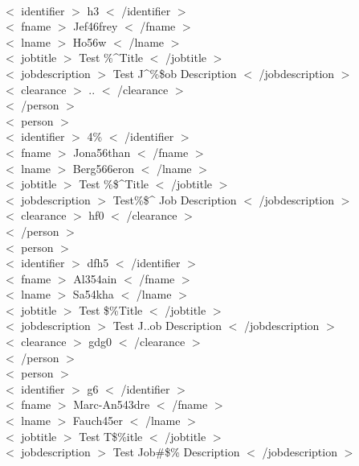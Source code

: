 \documentclass[12pt]{article}
\newcommand{\tab}{\hspace*{2em}}
\begin{document}
{\\ \tab\tab $<$ identifier $>$ h3 $<$ /identifier $>$ 
\\ \tab\tab $<$ fname $>$ Jef46frey $<$ /fname $>$ 
\\ \tab\tab $<$ lname $>$ Ho56w $<$ /lname $>$ 
\\ \tab\tab $<$ jobtitle $>$ Test \%\^{}Title $<$ /jobtitle $>$ 
\\ \tab\tab $<$ jobdescription $>$ Test J\^{}\%\$ob Description $<$ /jobdescription $>$ 
\\ \tab\tab $<$ clearance $>$ .. $<$ /clearance $>$ 
\\ \tab$<$ /person $>$ 
\\ \tab$<$ person $>$ 
\\ \tab\tab $<$ identifier $>$ 4\% $<$ /identifier $>$ 
\\ \tab\tab $<$ fname $>$ Jona56than $<$ /fname $>$ 
\\ \tab\tab $<$ lname $>$ Berg566eron $<$ /lname $>$ 
\\ \tab\tab $<$ jobtitle $>$ Test \%\$\^{}Title $<$ /jobtitle $>$ 
\\ \tab\tab $<$ jobdescription $>$ Test\%\$\^{}  Job Description $<$ /jobdescription $>$ 
\\ \tab\tab $<$ clearance $>$ hf0 $<$ /clearance $>$ 
\\ \tab$<$ /person $>$ 
\\ \tab$<$ person $>$ 
\\ \tab\tab $<$ identifier $>$ dfh5 $<$ /identifier $>$ 
\\ \tab\tab $<$ fname $>$ Al354ain $<$ /fname $>$ 
\\ \tab\tab $<$ lname $>$ Sa54kha $<$ /lname $>$ 
\\ \tab\tab $<$ jobtitle $>$ Test \$\%Title $<$ /jobtitle $>$ 
\\ \tab\tab $<$ jobdescription $>$ Test J..ob Description $<$ /jobdescription $>$ 
\\ \tab\tab $<$ clearance $>$ gdg0 $<$ /clearance $>$ 
\\ \tab$<$ /person $>$ 
\\ \tab$<$ person $>$ 
\\ \tab\tab $<$ identifier $>$ g6 $<$ /identifier $>$ 
\\ \tab\tab $<$ fname $>$ Marc-An543dre $<$ /fname $>$ 
\\ \tab\tab $<$ lname $>$ Fauch45er $<$ /lname $>$ 
\\ \tab\tab $<$ jobtitle $>$ Test T\$\%itle $<$ /jobtitle $>$ 
\\ \tab\tab $<$ jobdescription $>$ Test Job\#\$\% Description $<$ /jobdescription $>$ 
}
\end{document}
